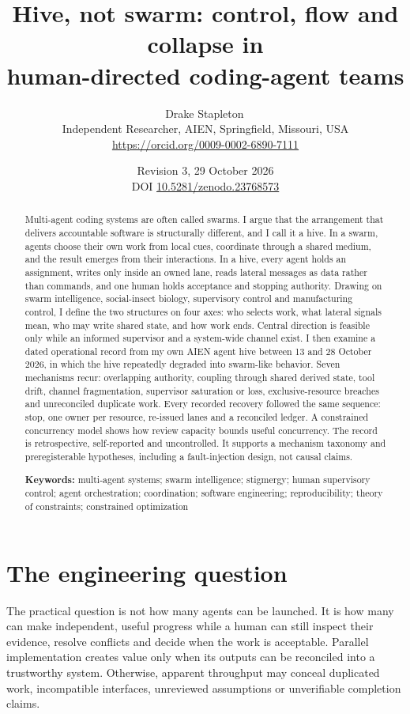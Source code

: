 \documentclass[11pt]{article}
\title{Hive, not swarm: control, flow and collapse in\\ human-directed coding-agent teams}
\author{Drake Stapleton\,\orcid\\
\small Independent Researcher, AIEN, Springfield, Missouri, USA\\
\small \url{https://orcid.org/0009-0002-6890-7111}}
\date{Revision 3, 29 October 2026\\ \small DOI \href{https://doi.org/10.5281/zenodo.23768573}{10.5281/zenodo.23768573}}
\begin{document}
\maketitle

\begin{abstract}
Multi-agent coding systems are often called swarms. I argue that the arrangement that delivers accountable software is structurally different, and I call it a hive. In a swarm, agents choose their own work from local cues, coordinate through a shared medium, and the result emerges from their interactions. In a hive, every agent holds an assignment, writes only inside an owned lane, reads lateral messages as data rather than commands, and one human holds acceptance and stopping authority. Drawing on swarm intelligence, social-insect biology, supervisory control and manufacturing control, I define the two structures on four axes: who selects work, what lateral signals mean, who may write shared state, and how work ends. Central direction is feasible only while an informed supervisor and a system-wide channel exist. I then examine a dated operational record from my own AIEN agent hive between 13 and 28 October 2026, in which the hive repeatedly degraded into swarm-like behavior. Seven mechanisms recur: overlapping authority, coupling through shared derived state, tool drift, channel fragmentation, supervisor saturation or loss, exclusive-resource breaches and unreconciled duplicate work. Every recorded recovery followed the same sequence: stop, one owner per resource, re-issued lanes and a reconciled ledger. A constrained concurrency model shows how review capacity bounds useful concurrency. The record is retrospective, self-reported and uncontrolled. It supports a mechanism taxonomy and preregisterable hypotheses, including a fault-injection design, not causal claims.

\textbf{Keywords:} multi-agent systems; swarm intelligence; stigmergy; human supervisory control; agent orchestration; coordination; software engineering; reproducibility; theory of constraints; constrained optimization
\end{abstract}

\section{The engineering question}

The practical question is not how many agents can be launched. It is how many can make independent, useful progress while a human can still inspect their evidence, resolve conflicts and decide when the work is acceptable. Parallel implementation creates value only when its outputs can be reconciled into a trustworthy system. Otherwise, apparent throughput may conceal duplicated work, incompatible interfaces, unreviewed assumptions or unverifiable completion claims.
\end{document}
